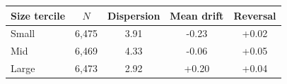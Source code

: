 \begin{tabular}{lcccc}
\toprule
Size tercile & $N$ & Dispersion & Mean drift & Reversal \\
\midrule
Small & 6,475 & 3.91 & -0.23 & +0.02 \\
Mid & 6,469 & 4.33 & -0.06 & +0.05 \\
Large & 6,473 & 2.92 & +0.20 & +0.04 \\
\bottomrule
\end{tabular}